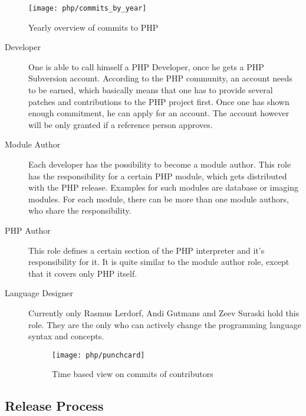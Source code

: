 \begin{figure}[htbp]
  \centering
  \texttt{[image: php/commits\_by\_year]}
  \caption{Yearly overview of commits to PHP}
\end{figure}

\begin{description}

  \item[Developer] One is able to call himself a PHP Developer, once he gets a
    PHP Subversion account. According to the PHP community, an account needs to
    be earned, which basically means that one has to provide several patches
    and contributions to the PHP project first. Once one has shown enough
    commitment, he can apply for an account. The account however will be only
    granted if a reference person approves.

  \item[Module Author] Each developer has the possibility to become a module
    author. This role has the responsibility for a certain PHP module, which
    gets distributed with the PHP release. Examples for such modules are
    database or imaging modules. For each module, there can be more than one
    module authors, who share the responsibility.

  \item[PHP Author] This role defines a certain section of the PHP interpreter
    and it's responsibility for it. It is quite similar to the module author
    role, except that it covers only PHP itself.

  \item[Language Designer] Currently only Rasmus Lerdorf, Andi Gutmans and Zeev
    Suraski hold this role. They are the only who can actively change the
    programming language syntax and concepts.

\begin{figure}[hbtp]
  \centering
  \texttt{[image: php/punchcard]}
  \caption{Time based view on commits of contributors}
\end{figure}

\end{description}


\subsection{Release Process} %

